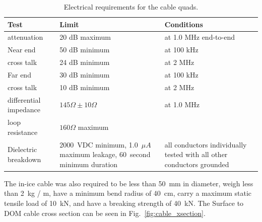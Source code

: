 \begin{table}[h]
  \centering
  \begin{tabularx}{\textwidth}{| l | X | X | }
    \hline
    \bf{Test} & \bf{Limit} & \bf{Conditions} \\
    \hline

    attenuation & 20 dB maximum & at 1.0 MHz end-to-end \\
    \hline
%

   Near end & 50 dB minimum & at 100 kHz \\
    \cline {2-3}
    \cline {2-3}
   cross talk & 24 dB minimum & at 2 MHz \\
    \hline

    Far end & 30 dB minimum & at 100 kHz\\
    \cline {2-3}
    \cline {2-3}
    cross talk& 10 dB minimum & at 2 MHz \\
    \hline

    differential impedance & $145\Omega \pm 10\Omega$ & at 1.0 MHz \\
    \hline

    loop resistance & $160\Omega$ maximum & \\
    \hline

    Dielectric breakdown & 2000~VDC minimum, 1.0~$\mu A$ maximum leakage, 60~second
    minimum duration & all conductors individually tested with all other
    conductors grounded \\
    \hline    
  \end{tabularx}
  \caption{Electrical requirements for the cable quads.} 
  \label{tab:quad_requirements}
\end{table}

 The in-ice cable was also required to be less than 50~mm in
 diameter, weigh less than 2~kg / m, have a minimum bend radius of 40~cm,
 carry a maximum static tensile load of 10~kN, and have a breaking strength
 of 40~kN. The Surface to DOM cable cross section can be seen in
 Fig.~\ref{fig:cable_xsection}.  


